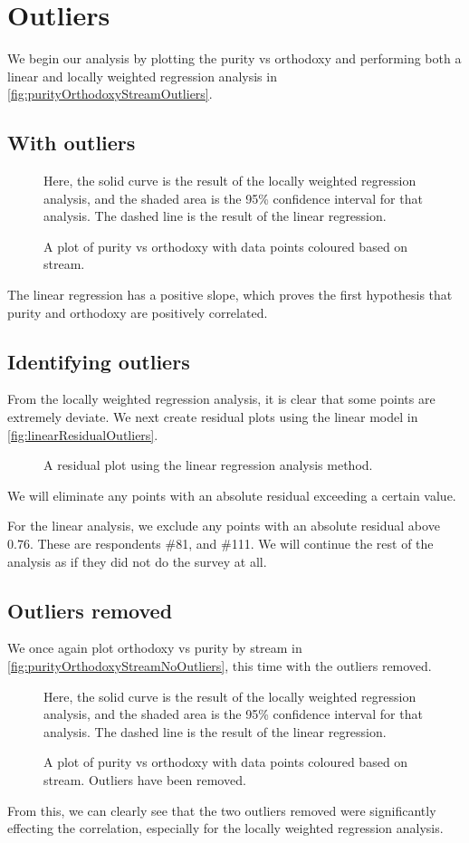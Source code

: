 \chapter{Outliers}\label{chap:outliers}

We begin our analysis by plotting the purity vs orthodoxy and performing both a linear and locally weighted regression analysis in \vref{fig:purityOrthodoxyStreamOutliers}.

\section{With outliers}
\begin{figure}[H]
	\caption{A plot of purity vs orthodoxy with data points coloured based on stream.}
	\label{fig:purityOrthodoxyStreamOutliers}
	Here, the solid curve is the result of the locally weighted regression analysis, and the shaded area is the 95\% confidence interval for that analysis.
	The dashed line is the result of the linear regression.
\end{figure}

The linear regression has a positive slope, which proves the first hypothesis that purity and orthodoxy are positively correlated.

\section{Identifying outliers}
From the locally weighted regression analysis, it is clear that some points are extremely deviate.
We next create residual plots using the linear model in \vref{fig:linearResidualOutliers}.

\begin{figure}[H]
	\caption{A residual plot using the linear regression analysis method.}
	\label{fig:linearResidualOutliers}
\end{figure}

We will eliminate any points with an absolute residual exceeding a certain value.

For the linear analysis, we exclude any points with an absolute residual above $0.76$.
These are respondents \#81, and \#111.
We will continue the rest of the analysis as if they did not do the survey at all.

\section{Outliers removed}
We once again plot orthodoxy vs purity by stream in \vref{fig:purityOrthodoxyStreamNoOutliers}, this time with the outliers removed.
\begin{figure}[H]
	\caption{A plot of purity vs orthodoxy with data points coloured based on stream. Outliers have been removed.}
	\label{fig:purityOrthodoxyStreamNoOutliers}
	Here, the solid curve is the result of the locally weighted regression analysis, and the shaded area is the 95\% confidence interval for that analysis.
	The dashed line is the result of the linear regression.
\end{figure}

From this, we can clearly see that the two outliers removed were significantly effecting the correlation, especially for the locally weighted regression analysis.
